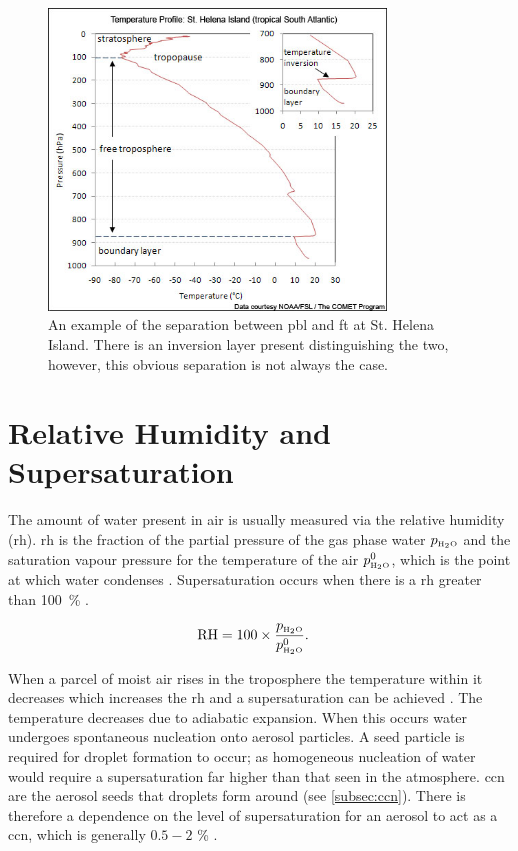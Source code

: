 \begin{figure}[!htb]
	\centering
	\includegraphics[width=0.8\textwidth,natwidth=493,natheight=440]{Fig/helena_island_skewt.jpg}
	\caption{An example of the separation between \gls{pbl} and \gls{ft} at St. Helena Island. There is an inversion layer present distinguishing the two, however, this obvious separation is not always the case. \citep[Section 1.5.1]{laing2011introduction}}
 	\label{fig:atmolay}
\end{figure}

\section{Relative Humidity and Supersaturation}
\label{subsec:relhum}

The amount of water present in air is usually measured via the relative humidity (\gls{rh}). \gls{rh} is the fraction of the partial pressure of the gas phase water $p_{\text{\tiny H}_2\text{\tiny O}}$ and the saturation vapour pressure for the temperature of the air $p_{\text{\tiny H}_2\text{\tiny O}}^0$, which is the point at which water condenses \citep[Chapter 1]{seinfeld2012atmospheric}. Supersaturation occurs when there is a \gls{rh} greater than \SI{100}{\percent} \citep{rogers1989short}.

\begin{align}
\label{eq:relhum}
	\mathrm{RH} &= 100 \times \frac{p_{\text{\tiny H}_2\text{\tiny O}}}{p_{\text{\tiny H}_2\text{\tiny O}}^0}.
\end{align}

When a parcel of moist air rises in the troposphere the temperature within it decreases which increases the \gls{rh} and a supersaturation can be achieved \citep[Chapter 1]{seinfeld2012atmospheric}. The temperature decreases due to adiabatic expansion. When this occurs water undergoes spontaneous nucleation onto aerosol particles. A seed particle is required for droplet formation to occur; as homogeneous nucleation of water would require a supersaturation far higher than that seen in the atmosphere. \gls{ccn} are the aerosol seeds that droplets form around (see \cref{subsec:ccn}). There is therefore a dependence on the level of supersaturation for an aerosol to act as a \gls{ccn}, which is generally $0.5 - 2$ \si{\percent} \citep[Chapter 6]{rogers1989short}.


